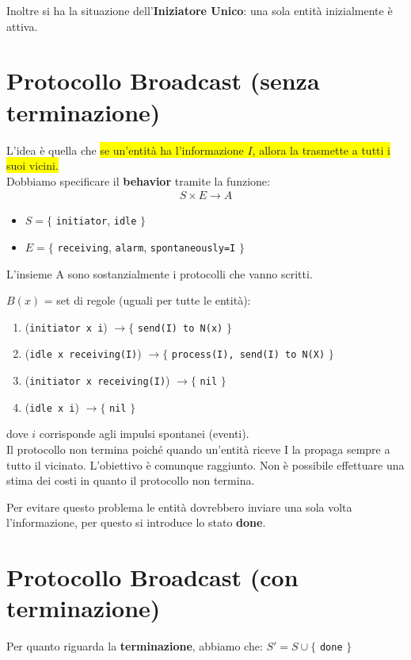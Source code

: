 Inoltre si ha la situazione dell'\textbf{Iniziatore Unico}: una sola entità
inizialmente è attiva.

\section{Protocollo Broadcast (senza terminazione)}
L'idea è quella che \colorbox{yellow}{se un'entità ha l'informazione $I$, allora
    la trasmette a tutti i suoi vicini.} \\ Dobbiamo specificare il
\textbf{behavior} tramite la funzione:
\begin{eqnarray}
    S \times E \rightarrow A
    \nonumber
\end{eqnarray}
\begin{itemize}
    \item $S=\lbrace$ \texttt{initiator}, \texttt{idle} $\rbrace$
    \item $E=\lbrace$ \texttt{receiving}, \texttt{alarm}, \texttt{spontaneously=I}
          $\rbrace$
\end{itemize}

L'insieme A sono sostanzialmente i protocolli che vanno scritti.

$B(x)$ = set di regole (uguali per tutte le entità):
\begin{enumerate}
    \item (\texttt{initiator x i}) $\rightarrow \lbrace$ \texttt{send(I) to N(x)}
          $\rbrace$
    \item (\texttt{idle x receiving(I)}) $\rightarrow \lbrace$ \texttt{process(I),
              send(I) to N(X)} $\rbrace$
    \item (\texttt{initiator x receiving(I)}) $\rightarrow \lbrace$ \texttt{nil}
          $\rbrace$
    \item (\texttt{idle x i}) $\rightarrow \lbrace$ \texttt{nil} $\rbrace$
\end{enumerate}
dove \textbf{$i$} corrisponde agli impulsi spontanei (eventi).\\

Il protocollo non termina poiché quando un'entità riceve I la propaga sempre a
tutto il vicinato. L'obiettivo è comunque raggiunto. Non è possibile effettuare
una stima dei costi in quanto il protocollo non termina.

Per evitare questo problema le entità dovrebbero inviare una sola volta
l'informazione, per questo si introduce lo stato \textbf{done}.

\section{Protocollo Broadcast (con terminazione)}
Per quanto riguarda la \textbf{terminazione}, abbiamo che: $S' = S \cup \lbrace$
\texttt{done} $\rbrace$

